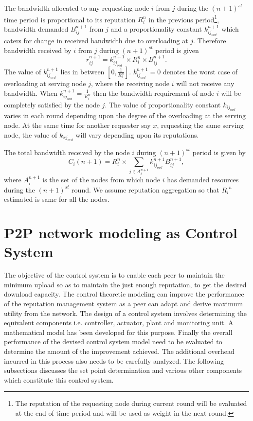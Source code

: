 \documentclass[journal]{IEEEtran}
\begin{document}
The bandwidth allocated to any requesting node $i$ from $j$ during the $(n+1)^{st}$ time period is proportional to its reputation $R^{n}_i$ in the  previous period\footnote{The reputation of the requesting node during current round will be evaluated at the end of time period and will be used as weight in the next round.}, bandwidth demanded $B_{ij}^{n+1}$ from $j$ and a proportionality constant $k_{{ij}_{ovd}}^{n+1}$ which caters for change in received bandwidth due to overloading at $j$.
Therefore bandwidth received by $i$ from $j$ during $(n+1)^{st}$ period is given
\begin{equation}
	r_{ij}^{n+1}=k_{{ij}_{ovd}}^{n+1}{\times}R^{n}_i{\times}B_{ij}^{n+1}.
\end{equation}
The value of $k_{{ij}_{ovd}}^{n+1}$ lies in between $[0,\frac{1}{R^{n}_i}]$. $k_{{ij}_{ovd}}^{n+1}=0$ denotes the worst case of overloading at serving node $j$, where the receiving node $i$ will not receive any bandwidth. When $k_{{ij}_{ovd}}^{n+1}=\frac{1}{R^{n}_i}$ then the bandwidth requirement of node $i$ will be completely satisfied by the node $j$. The value of proportionality constant $k_{{ij}_{ovd}}$ varies in each round depending upon the degree of the overloading at the serving node. At the same time for another requester say $x$, requesting the same serving node, the value of $k_{{xj}_{ovd}}$ will vary depending upon its reputations. 


The total bandwidth received by the node $i$ during $(n+1)^{st}$ period is given by
\begin{equation}
	\label{capacity}
	C_i(n+1)=R_i^{n}\times{\sum\limits_{j\in{A^{n+1}_i}}{k_{{ij}_{ovd}}^{n+1}}B_{ij}^{n+1}},
\end{equation}
where $A^{n+1}_i$ is the set of the nodes from which node $i$ has demanded resources during the $(n+1)^{st}$ round. We assume reputation aggregation so that ${R_i}^n$ estimated is same for all the nodes.
\section{P2P network modeling as Control System}
\label{C_sys}
The objective of the control system is to enable each peer to maintain the minimum upload so as to maintain the just enough  reputation, to get the desired download capacity. The control theoretic modeling can improve the performance of the reputation management system as a peer can adapt and derive maximum utility from the network. The design of a control system  involves determining the equivalent components i.e. controller, actuator, plant and monitoring unit. A mathematical model has been developed for this purpose. Finally the overall performance of the devised control system model need to be evaluated to determine the amount of the improvement achieved. The additional overhead incurred in this process also needs to be carefully analyzed. The following subsections discusses the set point determination and  various other components which constitute this control system. 
\end{document}
